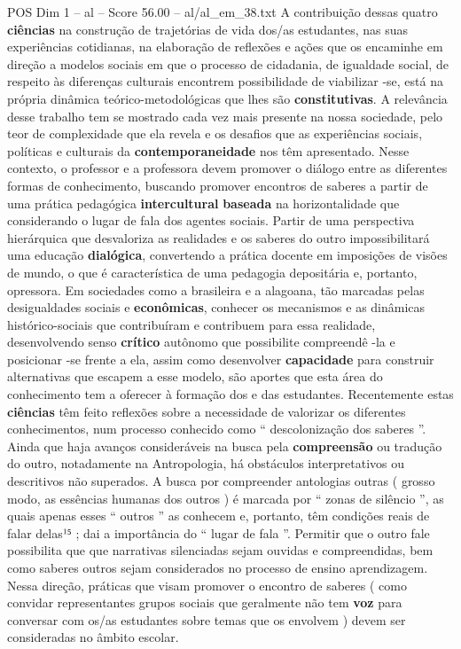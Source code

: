 \begin{textsample}{POS Dim 1 – al – Score 56.00 – al/al\_em\_38.txt}
A contribuição dessas quatro \textbf{ciências} na construção de trajetórias de vida dos/as estudantes, nas suas experiências cotidianas, na elaboração de reflexões e ações que os encaminhe em direção a modelos sociais em que o processo de cidadania, de igualdade social, de respeito às diferenças culturais encontrem possibilidade de viabilizar -se, está na própria dinâmica teórico-metodológicas que lhes são \textbf{constitutivas}.
A relevância desse trabalho tem se mostrado cada vez mais presente na nossa sociedade, pelo teor de complexidade que ela revela e os desafios que as experiências sociais, políticas e culturais da \textbf{contemporaneidade} nos têm apresentado.
Nesse contexto, o professor e a professora devem promover o diálogo entre as diferentes formas de conhecimento, buscando promover encontros de saberes a partir de uma prática pedagógica \textbf{intercultural} \textbf{baseada} na horizontalidade que considerando o lugar de fala dos agentes sociais.
Partir de uma perspectiva hierárquica que desvaloriza as realidades e os saberes do outro impossibilitará uma educação \textbf{dialógica}, convertendo a prática docente em imposições de visões de mundo, o que é característica de uma pedagogia depositária e, portanto, opressora.
Em sociedades como a brasileira e a alagoana, tão marcadas pelas desigualdades sociais e \textbf{econômicas}, conhecer os mecanismos e as dinâmicas histórico-sociais que contribuíram e contribuem para essa realidade, desenvolvendo senso \textbf{crítico} autônomo que possibilite compreendê -la e posicionar -se frente a ela, assim como desenvolver \textbf{capacidade} para construir alternativas que escapem a esse modelo, são aportes que esta área do conhecimento tem a oferecer à formação dos e das estudantes.
Recentemente estas \textbf{ciências} têm feito reflexões sobre a necessidade de valorizar os diferentes conhecimentos, num processo conhecido como “ descolonização dos saberes ”.
Ainda que haja avanços consideráveis na busca pela \textbf{compreensão} ou tradução do outro, notadamente na Antropologia, há obstáculos interpretativos ou descritivos não superados.
A busca por compreender antologias outras ( grosso modo, as essências humanas dos outros ) é marcada por “ zonas de silêncio ”, as quais apenas esses “ outros ” as conhecem e, portanto, têm condições reais de falar delas¹⁵ ; dai a importância do “ lugar de fala ”.
Permitir que o outro fale possibilita que que narrativas silenciadas sejam ouvidas e compreendidas, bem como saberes outros sejam considerados no processo de ensino aprendizagem.
Nessa direção, práticas que visam promover o encontro de saberes ( como convidar representantes grupos sociais que geralmente não tem \textbf{voz} para conversar com os/as estudantes sobre temas que os envolvem ) devem ser consideradas no âmbito escolar.

\end{textsample}
